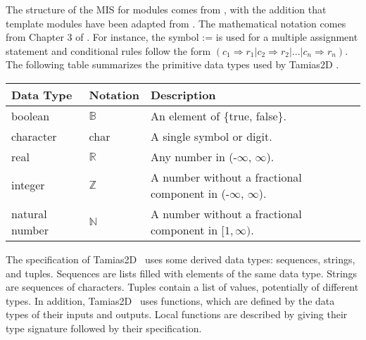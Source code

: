 \documentclass[12pt]{article}
\newcommand{\progname}{Tamias2D }
\begin{document}
The structure of the MIS for modules comes from \citet{HoffmanAndStrooper1995} ,
with the addition that template modules have been adapted from
\cite{GhezziEtAl2003} .  The mathematical notation comes from Chapter 3 of
\citet{HoffmanAndStrooper1995} .  
For instance, the symbol := is used for a
multiple assignment statement and conditional rules follow the form $(c_1
\Rightarrow r_1 | c_2 \Rightarrow r_2 | ... | c_n \Rightarrow r_n )$.\\

The following table summarizes the primitive data types used by \progname. 

\renewcommand*{\arraystretch}{1.2}
\noindent  \begin{longtable}{l l p{10.5cm}} 
\toprule 
\textbf{Data Type} & \textbf{Notation} & \textbf{Description} \\ 
\midrule
boolean & $\mathbb{B}$ & An element of \{true, false\}. \\
character & char & A single symbol or digit. \\
real & $\mathbb{R}$ & Any number in (-$\infty$, $\infty$). \\
integer & $\mathbb{Z}$ & A number without a fractional
  component in (-$\infty$, $\infty$). \\
natural number & $\mathbb{N}$ & A number without a fractional
  component in $[1, \infty)$. \\
\bottomrule
\end{longtable} 

The specification of \progname \ uses some derived data types: sequences, strings, and tuples. Sequences are lists filled with elements of the same data type. Strings
are sequences of characters. Tuples contain a list of values, potentially of different types. In addition, \progname \ uses functions, which
are defined by the data types of their inputs and outputs. Local functions are described by giving their type signature followed by their specification.



\end{document}
